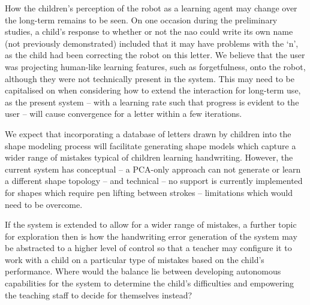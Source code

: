 \documentclass{sig-alternate}
\begin{document}

How the children's perception of the robot as a learning agent may change over
the long-term remains to be seen. On one occasion during the preliminary
studies, a child's response to whether or not the {\sc nao} could write its own
name (not previously demonstrated) included that it may have problems with the
`n', as the child had been correcting the robot on this letter. We believe that
the user was projecting human-like learning features, such as forgetfulness,
onto the robot, although they were not technically present in the system.  This
may need to be capitalised on when considering how to extend the interaction for
long-term use, as the present system -- with a learning rate such that progress
is evident to the user -- will cause convergence for a letter within a few
iterations.

We expect that incorporating a database of letters drawn by children into the
shape modeling process will facilitate generating shape models which capture a
wider range of mistakes typical of children learning handwriting. However, the
current system has conceptual -- a PCA-only approach can not generate or learn a
different shape topology -- and technical -- no support is currently implemented
for shapes which require pen lifting between strokes -- limitations which would
need to be overcome.

If the system is extended to allow for a wider range of mistakes, a further
topic for exploration then is how the handwriting error generation of the system
may be abstracted to a higher level of control so that a teacher may configure
it to work with a child on a particular type of mistakes based on the child's
performance. Where would the balance lie between developing autonomous
capabilities for the system to determine the child's difficulties and empowering
the teaching staff to decide for themselves instead? 
\end{document}
